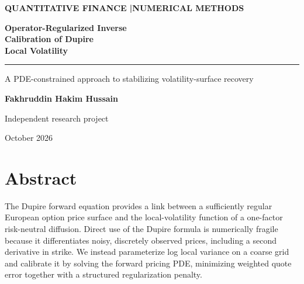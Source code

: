 \documentclass[11pt,a4paper]{article}
\begin{document}
\begin{titlepage}
\thispagestyle{empty}
\vspace*{28mm}
{\sffamily\small\color{teal}\textbf{QUANTITATIVE FINANCE \quad|\quad NUMERICAL METHODS}\par}
\vspace{13mm}
{\sffamily\bfseries\color{navy}\fontsize{27}{33}\selectfont Operator-Regularized Inverse\\[3pt] Calibration of Dupire\\[3pt] Local Volatility\par}
\vspace{8mm}
{\color{teal}\rule{28mm}{2pt}\par}
\vspace{7mm}
{\large\color{midgrey}A PDE-constrained approach to stabilizing volatility-surface recovery\par}
\vfill
{\sffamily\large\textbf{Fakhruddin Hakim Hussain}\par}
\vspace{2mm}
{\sffamily\normalsize Independent research project\par}
\vspace{10mm}
{\small October 2026\par}
\end{titlepage}

\section*{Abstract}
The Dupire forward equation provides a link between a sufficiently regular European option price surface and the local-volatility function of a one-factor risk-neutral diffusion. Direct use of the Dupire formula is numerically fragile because it differentiates noisy, discretely observed prices, including a second derivative in strike. We instead parameterize log local variance on a coarse grid and calibrate it by solving the forward pricing PDE, minimizing weighted quote error together with a structured regularization penalty.
\end{document}
